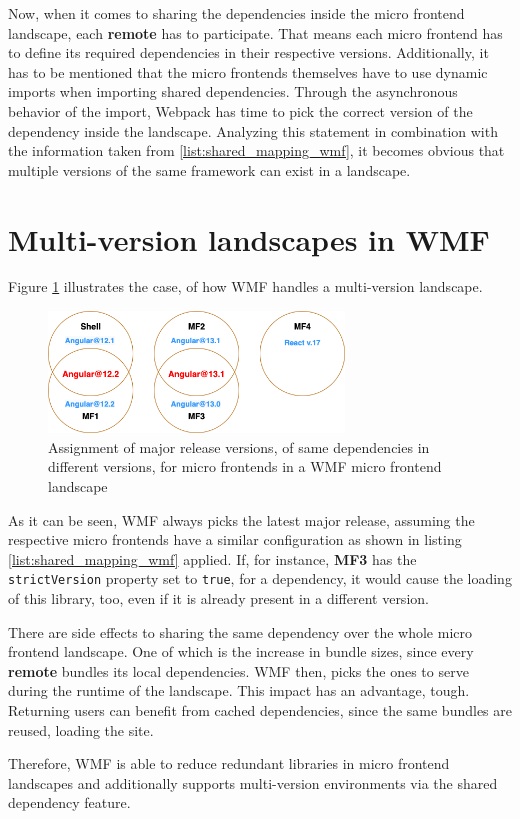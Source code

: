 Now, when it comes to sharing the dependencies inside the micro frontend landscape, each \textbf{remote} has to participate. That means each micro frontend has to define its required dependencies in their respective versions. Additionally, it has to be mentioned that the micro frontends themselves have to use dynamic imports when importing shared dependencies. Through the asynchronous behavior of the import, Webpack has time to pick the correct version of the dependency inside the landscape.\cite{wmf_concepts}
Analyzing this statement in combination with the information taken from \ref{list:shared_mapping_wmf}, it becomes obvious that multiple versions of the same framework can exist in a landscape. 

\section{Multi-version landscapes in WMF}

Figure \ref{fig:wmf_multiversions} illustrates the case, of how WMF handles a multi-version landscape.

\begin{figure}[!h]
	\centering
	\includegraphics[width=0.7\textwidth]{Figures/multi_version_diagramm.drawio.png}
	\caption{Assignment of major release versions, of same dependencies in different versions, for micro frontends in a WMF micro frontend landscape}
	\label{fig:wmf_multiversions}
\end{figure}

As it can be seen, WMF always picks the latest major release, assuming the respective micro frontends have a similar configuration as shown in listing \ref{list:shared_mapping_wmf} applied. If, for instance, \textbf{MF3} has the \texttt{strictVersion} property set to \texttt{true}, for a dependency, it would cause the loading of this library, too, even if it is already present in a different version.

There are side effects to sharing the same dependency over the whole micro frontend landscape. One of which is the increase in bundle sizes, since every \textbf{remote} bundles its local dependencies. WMF then, picks the ones to serve during the runtime of the landscape.
This impact has an advantage, tough. Returning users can benefit from cached dependencies, since the same bundles are reused, loading the site.\cite{wmf_multi_versions}

Therefore, WMF is able to reduce redundant libraries in micro frontend landscapes and additionally supports multi-version environments via the shared dependency feature.